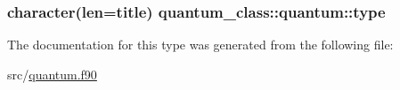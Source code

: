 \hypertarget{structquantum__class_1_1quantum_aa222a9bd02a7dd3f8b37cdbcd33a6d74}{
\subsubsection[{type}]{\setlength{\rightskip}{0pt plus 5cm}character(len=title) quantum\-\_\-class\-::quantum\-::type\hspace{0.3cm}{\ttfamily [private]}}}\label{structquantum__class_1_1quantum_aa222a9bd02a7dd3f8b37cdbcd33a6d74}


The documentation for this type was generated from the following file\-:\begin{DoxyCompactItemize}
\item 
src/\hyperlink{quantum_8f90}{quantum.\-f90}\end{DoxyCompactItemize}
